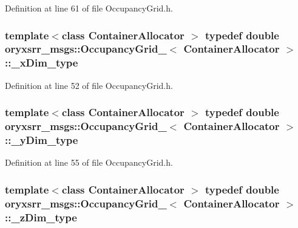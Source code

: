 \-Definition at line 61 of file \-Occupancy\-Grid.\-h.

\subsubsection[{\-\_\-x\-Dim\-\_\-type}]{\setlength{\rightskip}{0pt plus 5cm}template$<$class Container\-Allocator $>$ typedef double {\bf oryxsrr\-\_\-msgs\-::\-Occupancy\-Grid\-\_\-}$<$ \-Container\-Allocator $>$\-::{\bf \-\_\-x\-Dim\-\_\-type}}\label{structoryxsrr__msgs_1_1OccupancyGrid___aede7301617437ce41990bceaddcc2e98}


\-Definition at line 52 of file \-Occupancy\-Grid.\-h.

\subsubsection[{\-\_\-y\-Dim\-\_\-type}]{\setlength{\rightskip}{0pt plus 5cm}template$<$class Container\-Allocator $>$ typedef double {\bf oryxsrr\-\_\-msgs\-::\-Occupancy\-Grid\-\_\-}$<$ \-Container\-Allocator $>$\-::{\bf \-\_\-y\-Dim\-\_\-type}}\label{structoryxsrr__msgs_1_1OccupancyGrid___aa2172db805d87e84a63ecc855b51852f}


\-Definition at line 55 of file \-Occupancy\-Grid.\-h.

\subsubsection[{\-\_\-z\-Dim\-\_\-type}]{\setlength{\rightskip}{0pt plus 5cm}template$<$class Container\-Allocator $>$ typedef double {\bf oryxsrr\-\_\-msgs\-::\-Occupancy\-Grid\-\_\-}$<$ \-Container\-Allocator $>$\-::{\bf \-\_\-z\-Dim\-\_\-type}}\label{structoryxsrr__msgs_1_1OccupancyGrid___a46ed995f9e21191793a9fd9bd0b3d3a2}


